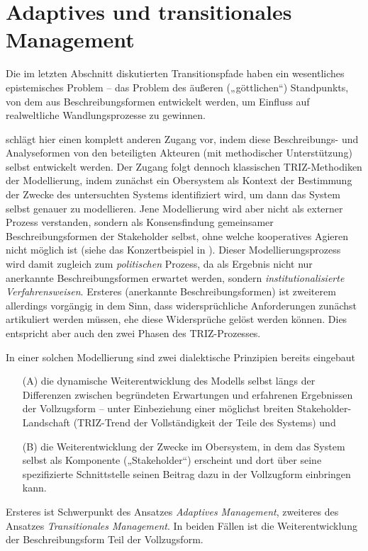 \documentclass[12pt,a4paper]{article}
\begin{document}
\section{Adaptives und transitionales Management}

Die im letzten Abschnitt diskutierten Transitionspfade haben ein wesentliches
epistemisches Problem -- das Problem des äußeren („göttlichen“) Standpunkts,
von dem aus Beschreibungsformen entwickelt werden, um Einfluss auf
realweltliche Wandlungsprozesse zu gewinnen.

\cite{Foxon2009} schlägt hier einen komplett anderen Zugang vor, indem diese
Beschreibungs- und Analyseformen von den beteiligten Akteuren (mit
methodischer Unterstützung) selbst entwickelt werden. Der Zugang folgt dennoch
klassischen TRIZ-Methodiken der Modellierung, indem zunächst ein Obersystem
als Kontext der Bestimmung der Zwecke des untersuchten Systems identifiziert
wird, um dann das System selbst genauer zu modellieren. Jene Modellierung wird
aber nicht als externer Prozess verstanden, sondern als Konsensfindung
gemeinsamer Beschreibungsformen der Stakeholder selbst, ohne welche
kooperatives Agieren nicht möglich ist (siehe das Konzertbeispiel in
\cite{Graebe2020b}).  Dieser Modellierungsprozess wird damit zugleich zum
\emph{politischen} Prozess, da als Ergebnis nicht nur anerkannte
Beschreibungsformen erwartet werden, sondern \emph{institutionalisierte
  Verfahrensweisen}. Ersteres (anerkannte Beschreibungsformen) ist zweiterem
allerdings vorgängig in dem Sinn, dass widersprüchliche Anforderungen zunächst
artikuliert werden müssen, ehe diese Widersprüche gelöst werden können. Dies
entspricht aber auch den zwei Phasen des TRIZ-Prozesses.

In einer solchen Modellierung sind zwei dialektische Prinzipien bereits
eingebaut
\begin{itemize}
\item[(A)] die dynamische Weiterentwicklung des Modells selbst längs der
  Differenzen zwischen begründeten Erwartungen und erfahrenen Ergebnissen der
  Vollzugsform -- unter Einbeziehung einer möglichst breiten
  Stakeholder-Landschaft (TRIZ-Trend der Vollständigkeit der Teile des
  Systems) und
\item[(B)] die Weiterentwicklung der Zwecke im Obersystem, in dem das System
  selbst als Komponente („Stakeholder“) erscheint und dort über seine
  spezifizierte Schnittstelle seinen Beitrag dazu in der Vollzugform
  einbringen kann.
\end{itemize}
Ersteres ist Schwerpunkt des Ansatzes \emph{Adaptives Management}, zweiteres
des Ansatzes \emph{Transitionales Management}.  In beiden Fällen ist die
Weiterentwicklung der Beschreibungsform Teil der Vollzugsform.
\end{document}
